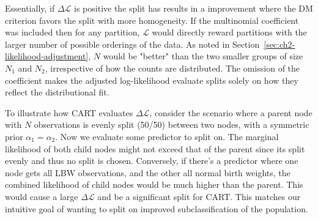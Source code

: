 Essentially, if \(\Delta\mathcal{L}\) is positive the split has results in a improvement where the DM criterion favors the split with more homogeneity. If the multinomial coefficient was included then for any partition, \(\mathcal{L}\) would directly reward partitions with the larger number of possible orderings of the data. As noted in Section~\ref{sec:ch2-likelihood-adjustment}, \(N\) would be "better" than the two smaller groups of size \(N_1\) and \(N_2\), irrespective of how the counts are distributed. The omission of the coefficient makes the adjusted log-likelihood evaluate splits solely on how they reflect the distributional fit. 

To illustrate how CART evaluates \(\Delta\mathcal{L}\), consider the scenario where a parent node with \(N\) observations is evenly split (50/50) between two nodes, with a symmetric prior \(\alpha_1 = \alpha_2\). Now we evaluate some predictor to split on. The marginal likelihood of both child nodes might not exceed that of the parent since its split evenly and thus no split is chosen. Conversely, if there's a predictor where one node gets all LBW observations, and the other all normal birth weights, the combined likelihood of child nodes would be much higher than the parent. This would cause a large \(\Delta\mathcal{L}\) and be a significant split for CART. This matches our intuitive goal of wanting to split on improved subclassification of the population.
